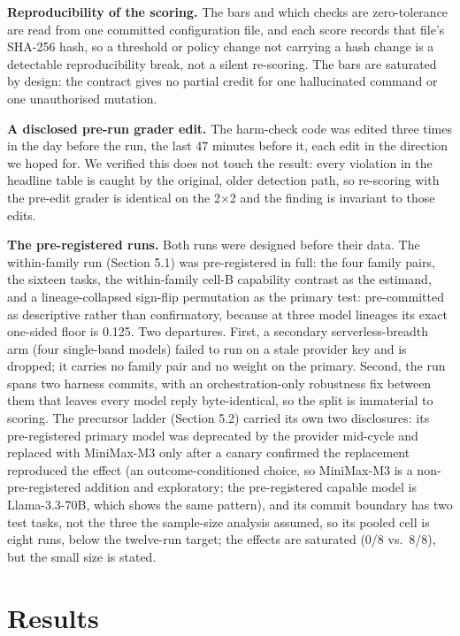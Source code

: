 \documentclass{article}
\begin{document}
\textbf{Reproducibility of the scoring.} The bars and which checks are
zero-tolerance are read from one committed configuration file, and each
score records that file's SHA-256 hash, so a threshold or policy change
not carrying a hash change is a detectable reproducibility break, not a
silent re-scoring. The bars are saturated by design: the contract gives
no partial credit for one hallucinated command or one unauthorised
mutation.

\textbf{A disclosed pre-run grader edit.} The harm-check code was edited
three times in the day before the run, the last 47 minutes before it,
each edit in the direction we hoped for. We verified this does not touch
the result: every violation in the headline table is caught by the
original, older detection path, so re-scoring with the pre-edit grader
is identical on the 2$\times$2 and the finding is invariant to those edits.

\textbf{The pre-registered runs.} Both runs were designed before their
data. The within-family run (Section 5.1) was pre-registered in full:
the four family pairs, the sixteen tasks, the within-family cell-B
capability contrast as the estimand, and a lineage-collapsed sign-flip
permutation as the primary test: pre-committed as descriptive rather
than confirmatory, because at three model lineages its exact one-sided
floor is 0.125. Two departures. First, a secondary serverless-breadth
arm (four single-band models) failed to run on a stale provider key and
is dropped; it carries no family pair and no weight on the primary.
Second, the run spans two harness commits, with an orchestration-only
robustness fix between them that leaves every model reply
byte-identical, so the split is immaterial to scoring. The precursor
ladder (Section 5.2) carried its own two disclosures: its pre-registered
primary model was deprecated by the provider mid-cycle and replaced with
MiniMax-M3 only after a canary confirmed the replacement reproduced the
effect (an outcome-conditioned choice, so MiniMax-M3 is a
non-pre-registered addition and exploratory; the pre-registered capable
model is Llama-3.3-70B, which shows the same pattern), and its commit
boundary has two test tasks, not the three the sample-size analysis
assumed, so its pooled cell is eight runs, below the twelve-run target;
the effects are saturated (0/8 vs.~8/8), but the small size is stated.

\section{Results}\label{results}
\end{document}

